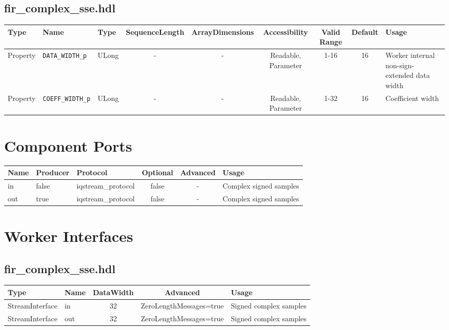 \documentclass{article}
\def\comp{fir\_complex\_sse}
\begin{document}
\begin{landscape}
	\subsection*{\comp.hdl}
	\begin{scriptsize}
		\begin{tabular}{|p{3cm}|p{2cm}|p{1cm}|c|c|c|c|c|p{5cm}|}
			\hline
			\rowcolor{blue}
			Type     & Name                 & Type  & SequenceLength & ArrayDimensions & Accessibility       & Valid Range & Default & Usage                                        \\
			\hline
			Property & \verb+DATA_WIDTH_p+  & ULong & -              & -               & Readable, Parameter & 1-16        & 16      & Worker internal non-sign-extended data width \\
			\hline
			Property & \verb+COEFF_WIDTH_p+ & ULong & -              & -               & Readable, Parameter & 1-32        & 16      & Coefficient width                            \\
			\hline
		\end{tabular}
	\end{scriptsize}


	\section*{Component Ports}
	\begin{scriptsize}
		\begin{tabular}{|M{2cm}|M{1.5cm}|M{4cm}|c|c|M{9cm}|}
			\hline
			\rowcolor{blue}
			Name & Producer & Protocol           & Optional & Advanced & Usage                  \\
			\hline
			in   & false    & iqstream\_protocol & false    & -        & Complex signed samples \\
			\hline
			out  & true     & iqstream\_protocol & false    & -        & Complex signed samples \\
			\hline
		\end{tabular}
	\end{scriptsize}

	\section*{Worker Interfaces}
	\subsection*{\comp.hdl}
	\begin{scriptsize}
		\begin{tabular}{|M{2cm}|M{1.5cm}|c|c|M{12cm}|}
			\hline
			Type            & Name & DataWidth & Advanced                & Usage                  \\
			\hline
			StreamInterface & in   & 32        & ZeroLengthMessages=true & Signed complex samples \\
			\hline
			StreamInterface & out  & 32        & ZeroLengthMessages=true & Signed complex samples \\
			\hline
		\end{tabular}
	\end{scriptsize}
\end{landscape}
\end{document}
